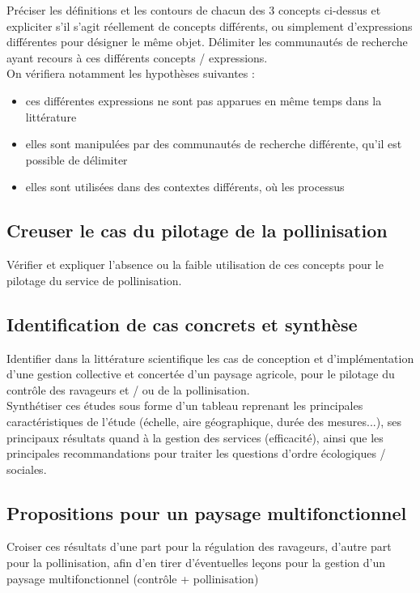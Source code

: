 \documentclass[11pt,a4paper,final]{article}
\begin{document}
Préciser les définitions et les contours de chacun des 3 concepts ci-dessus et expliciter s'il s'agit réellement de concepts différents, ou simplement d'expressions différentes pour désigner le même objet. Délimiter les communautés de recherche ayant recours à ces différents concepts / expressions.\\

On vérifiera notamment les hypothèses suivantes :

\begin{itemize}
\medskip 
\item ces différentes expressions ne sont pas apparues en même temps dans la littérature
\item elles sont manipulées par des communautés de recherche différente, qu'il est possible de délimiter
\item elles sont utilisées dans des contextes différents, où les processus
\end{itemize}


\subsection{Creuser le cas du pilotage de la pollinisation}

Vérifier et expliquer l'absence ou la faible utilisation de ces concepts pour le pilotage du service de pollinisation.

\subsection{Identification de cas concrets et synthèse}

Identifier dans la littérature scientifique les cas de conception et d'implémentation d'une gestion collective et concertée d'un paysage agricole, pour le pilotage du contrôle des ravageurs et / ou de la pollinisation.\\

Synthétiser ces études sous forme d'un tableau reprenant les principales caractéristiques de l'étude (échelle, aire géographique, durée des mesures...), ses principaux résultats quand à la gestion des 
services (efficacité), ainsi que les principales recommandations pour traiter les questions d'ordre écologiques / sociales.

\subsection{Propositions pour un paysage multifonctionnel}

Croiser ces résultats d'une part pour la régulation des ravageurs, d'autre part pour la pollinisation, afin d'en tirer d'éventuelles leçons pour la gestion d'un paysage multifonctionnel (contrôle + pollinisation)

\newpage



\end{document}
